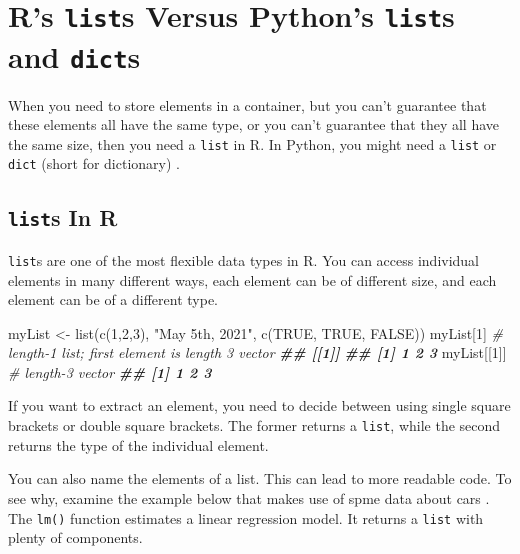\documentclass[
  12pt,
  krantz2]{krantz}
\makeatletter
\newenvironment{Shaded}{\begin{snugshade}}{\end{snugshade}}
\newcommand{\CommentTok}[1]{\textcolor[rgb]{0.37,0.37,0.37}{\textit{#1}}}
\newcommand{\ConstantTok}[1]{\textcolor[rgb]{0,0,0}{#1}}
\newcommand{\DecValTok}[1]{\textcolor[rgb]{0.06,0.06,0.06}{#1}}
\newcommand{\DocumentationTok}[1]{\textcolor[rgb]{0.37,0.37,0.37}{\textbf{\textit{#1}}}}
\newcommand{\FunctionTok}[1]{\textcolor[rgb]{0,0,0}{#1}}
\newcommand{\NormalTok}[1]{#1}
\newcommand{\OtherTok}[1]{\textcolor[rgb]{0.37,0.37,0.37}{#1}}
\newcommand{\StringTok}[1]{\textcolor[rgb]{0.5,0.5,0.5}{#1}}
\newenvironment{kframe}{%
\medskip{}
\setlength{\fboxsep}{.8em}
 \def\at@end@of@kframe{}%
 \ifinner\ifhmode%
  \def\at@end@of@kframe{\end{minipage}}%
  \begin{minipage}{\columnwidth}%
 \fi\fi%
 \def\FrameCommand##1{\hskip\@totalleftmargin \hskip-\fboxsep
 \colorbox{shadecolor}{##1}\hskip-\fboxsep
     \hskip-\linewidth \hskip-\@totalleftmargin \hskip\columnwidth}%
 \MakeFramed {\advance\hsize-\width
   \@totalleftmargin\z@ \linewidth\hsize
   \@setminipage}}%
 {\par\unskip\endMakeFramed%
 \at@end@of@kframe}
\renewenvironment{Shaded}{\begin{kframe}}{\end{kframe}}
\makeatother
\begin{document}
\hypertarget{rs-lists-versus-pythons-lists-and-dicts}{%
\chapter{\texorpdfstring{R's \texttt{list}s Versus Python's \texttt{list}s and \texttt{dict}s}{R's lists Versus Python's lists and dicts}}\label{rs-lists-versus-pythons-lists-and-dicts}}

When you need to store elements in a container, but you can't guarantee that these elements all have the same type, or you can't guarantee that they all have the same size, then you need a \texttt{list} in R. In Python, you might need a \texttt{list} or \texttt{dict} (short for dictionary) \citep{Lutz13}.

\hypertarget{lists-in-r}{%
\section{\texorpdfstring{\texttt{list}s In R}{lists In R}}\label{lists-in-r}}

\texttt{list}s are one of the most flexible data types in R. You can access individual elements in many different ways, each element can be of different size, and each element can be of a different type.

\begin{Shaded}
\begin{Highlighting}[]
\NormalTok{myList }\OtherTok{\textless{}{-}} \FunctionTok{list}\NormalTok{(}\FunctionTok{c}\NormalTok{(}\DecValTok{1}\NormalTok{,}\DecValTok{2}\NormalTok{,}\DecValTok{3}\NormalTok{), }\StringTok{"May 5th, 2021"}\NormalTok{, }\FunctionTok{c}\NormalTok{(}\ConstantTok{TRUE}\NormalTok{, }\ConstantTok{TRUE}\NormalTok{, }\ConstantTok{FALSE}\NormalTok{))}
\NormalTok{myList[}\DecValTok{1}\NormalTok{] }\CommentTok{\# length{-}1 list; first element is length 3 vector}
\DocumentationTok{\#\# [[1]]}
\DocumentationTok{\#\# [1] 1 2 3}
\NormalTok{myList[[}\DecValTok{1}\NormalTok{]] }\CommentTok{\# length{-}3 vector}
\DocumentationTok{\#\# [1] 1 2 3}
\end{Highlighting}
\end{Shaded}

If you want to extract an element, you need to decide between using single square brackets or double square brackets. The former returns a \texttt{list}, while the second returns the type of the individual element.

You can also name the elements of a list. This can lead to more readable code. To see why, examine the example below that makes use of spme data about cars \citep{sas_cars}. The \texttt{lm()} function estimates a linear regression model. It returns a \texttt{list} with plenty of components.
\end{document}
